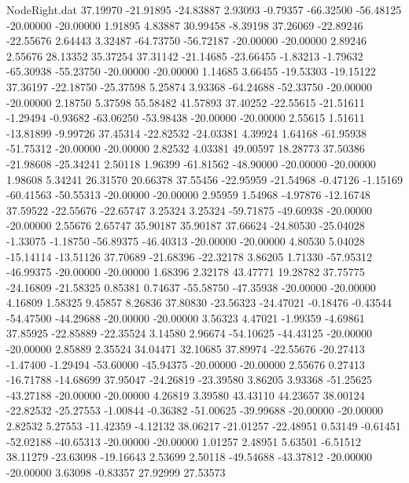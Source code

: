 \begin{filecontents}{NodeRight.dat}
  37.19970  -21.91895  -24.83887     2.93093   -0.79357  -66.32500  -56.48125  -20.00000  -20.00000    1.91895    4.83887   30.99458   -8.39198
  37.26069  -22.89246  -22.55676     2.64443    3.32487  -64.73750  -56.72187  -20.00000  -20.00000    2.89246    2.55676   28.13352   35.37254
  37.31142  -21.14685  -23.66455    -1.83213   -1.79632  -65.30938  -55.23750  -20.00000  -20.00000    1.14685    3.66455  -19.53303  -19.15122
  37.36197  -22.18750  -25.37598     5.25874    3.93368  -64.24688  -52.33750  -20.00000  -20.00000    2.18750    5.37598   55.58482   41.57893
  37.40252  -22.55615  -21.51611    -1.29494   -0.93682  -63.06250  -53.98438  -20.00000  -20.00000    2.55615    1.51611  -13.81899   -9.99726
  37.45314  -22.82532  -24.03381     4.39924    1.64168  -61.95938  -51.75312  -20.00000  -20.00000    2.82532    4.03381   49.00597   18.28773
  37.50386  -21.98608  -25.34241     2.50118    1.96399  -61.81562  -48.90000  -20.00000  -20.00000    1.98608    5.34241   26.31570   20.66378
  37.55456  -22.95959  -21.54968    -0.47126   -1.15169  -60.41563  -50.55313  -20.00000  -20.00000    2.95959    1.54968   -4.97876  -12.16748
  37.59522  -22.55676  -22.65747     3.25324    3.25324  -59.71875  -49.60938  -20.00000  -20.00000    2.55676    2.65747   35.90187   35.90187
  37.66624  -24.80530  -25.04028    -1.33075   -1.18750  -56.89375  -46.40313  -20.00000  -20.00000    4.80530    5.04028  -15.14114  -13.51126
  37.70689  -21.68396  -22.32178     3.86205    1.71330  -57.95312  -46.99375  -20.00000  -20.00000    1.68396    2.32178   43.47771   19.28782
  37.75775  -24.16809  -21.58325     0.85381    0.74637  -55.58750  -47.35938  -20.00000  -20.00000    4.16809    1.58325    9.45857    8.26836
  37.80830  -23.56323  -24.47021    -0.18476   -0.43544  -54.47500  -44.29688  -20.00000  -20.00000    3.56323    4.47021   -1.99359   -4.69861
  37.85925  -22.85889  -22.35524     3.14580    2.96674  -54.10625  -44.43125  -20.00000  -20.00000    2.85889    2.35524   34.04471   32.10685
  37.89974  -22.55676  -20.27413    -1.47400   -1.29494  -53.60000  -45.94375  -20.00000  -20.00000    2.55676    0.27413  -16.71788  -14.68699
  37.95047  -24.26819  -23.39580     3.86205    3.93368  -51.25625  -43.27188  -20.00000  -20.00000    4.26819    3.39580   43.43110   44.23657
  38.00124  -22.82532  -25.27553    -1.00844   -0.36382  -51.00625  -39.99688  -20.00000  -20.00000    2.82532    5.27553  -11.42359   -4.12132
  38.06217  -21.01257  -22.48951     0.53149   -0.61451  -52.02188  -40.65313  -20.00000  -20.00000    1.01257    2.48951    5.63501   -6.51512
  38.11279  -23.63098  -19.16643     2.53699    2.50118  -49.54688  -43.37812  -20.00000  -20.00000    3.63098   -0.83357   27.92999   27.53573

\end{filecontents}

